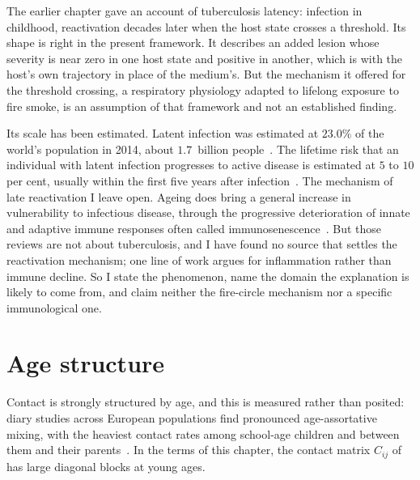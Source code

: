 \begin{remark}[Latency]
\label{sm:rem-latency}
The earlier chapter gave an account of tuberculosis latency: infection in
childhood, reactivation decades later when the host state crosses a
threshold. Its shape is right in the present framework. It describes an
added lesion whose severity is near zero in one host state and positive in
another, which is  with the host's own trajectory in
place of the medium's. But the mechanism it offered for the threshold crossing, a
respiratory physiology adapted to lifelong exposure to fire smoke, is an
assumption of that framework and not an established finding.

Its scale has been estimated. Latent infection was estimated
at $23.0\%$ of the world's population in 2014, about $1.7$~billion
people~\citep{houben2016global}. \lnkS{} The lifetime risk that an
individual with latent infection progresses to active disease is estimated
at $5$ to $10$ per cent, usually within the first five years after
infection~\citep{who2018ltbi}. \lnkS{} The mechanism of late reactivation I
leave open. Ageing does bring a general increase in vulnerability to
infectious disease, through the progressive deterioration of innate and
adaptive immune responses often called
immunosenescence~\citep{goronzy2013understanding,nikolichzugich2018twilight}.
\lnkS{} But those reviews are not about tuberculosis, and I have found no
source that settles the reactivation mechanism; one line of work argues for
inflammation rather than immune decline. So I state the phenomenon, name the
domain the explanation is likely to come from, and claim neither the
fire-circle mechanism nor a specific immunological one.
\end{remark}

\section{Age structure}
\label{sm:sec:age}

Contact is strongly structured by age, and this is measured rather than
posited: diary studies across European populations find pronounced
age-assortative mixing, with the heaviest contact rates among
school-age children and between them and their
parents~\citep{mossong2008social}. \lnkS{} In the terms of this chapter, the
contact matrix $C_{ij}$ of  has large diagonal
blocks at young ages.

